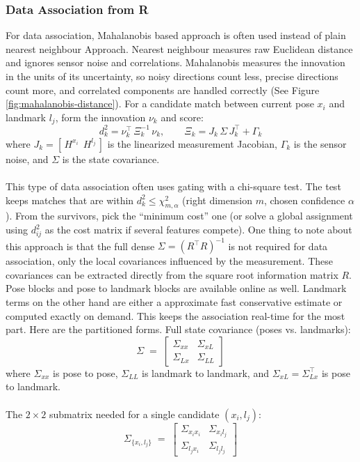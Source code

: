 \subsubsection{Data Association from R}\label{sssec:iSAM-data-association}
For data association, Mahalanobis based approach is often used instead of plain nearest neighbour Approach. Nearest neighbour measures raw Euclidean distance and ignores sensor noise and correlations. Mahalanobis measures the innovation in the units of its uncertainty, so noisy directions count less, precise directions count more, and correlated components are handled correctly (See Figure \ref{fig:mahalanobis-distance}). For a candidate match between current pose $x_i$ and landmark $l_j$, form the innovation $\nu_k$ and score:
$$
    d_k^2=\nu_k^\top\,\Xi_k^{-1}\,\nu_k,\qquad
    \Xi_k=J_k\,\Sigma\,J_k^\top+\Gamma_k
$$
\noindent
where $J_k=[\,H^{x_i}\ \ H^{l_j}\,]$ is the linearized measurement Jacobian, $\Gamma_k$ is the sensor noise, and $\Sigma$ is the state covariance. 
\\ \\
This type of data association often uses gating with a chi-square test. The test keeps matches that are within $d_k^2\le \chi^2_{m,\alpha}$ (right dimension $m$, chosen confidence $\alpha$). From the survivors, pick the ``minimum cost'' one (or solve a global assignment using $d_{ij}^2$ as the cost matrix if several features compete). One thing to note about this approach is that the full dense $\Sigma=(R^\top R)^{-1}$ is not required for data association, only the local covariances influenced by the measurement. These covariances can be extracted directly from the square root information matrix $R$. Pose blocks and pose to landmark blocks are available online as well. Landmark terms on the other hand are either a approximate fast conservative estimate or computed exactly on demand. This keeps the association real-time for the most part.
Here are the partitioned forms.
Full state covariance (poses vs. landmarks):
$$
    \Sigma \;=\;
    \begin{bmatrix}
    \Sigma_{xx} & \Sigma_{xL}\\[4pt]
    \Sigma_{Lx} & \Sigma_{LL}
    \end{bmatrix}
$$
\noindent
where $\Sigma_{xx}$ is pose to pose, $\Sigma_{LL}$ is landmark to landmark, and $\Sigma_{xL}=\Sigma_{Lx}^\top$ is pose to landmark.
\\ \\
The $2\times2$ submatrix needed for a single candidate $(x_i,l_j)$:
$$
\Sigma_{\{x_i,l_j\}} \;=\;
\begin{bmatrix}
\Sigma_{x_i x_i} & \Sigma_{x_i l_j}\\[4pt]
\Sigma_{l_j x_i} & \Sigma_{l_j l_j}
\end{bmatrix}
$$
